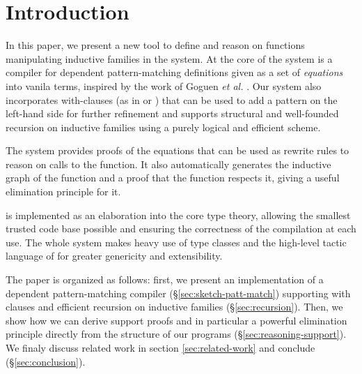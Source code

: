 \section{Introduction}

In this paper, we present a new tool to define and reason on functions
manipulating inductive families in the \Coq system.
At the core of the system is a compiler for dependent pattern-matching
definitions given as a set of \textit{equations} into vanila \Coq
terms, inspired by the work of Goguen {\it et al.}
\cite{DBLP:conf/birthday/GoguenMM06} . Our system also incorporates 
with-clauses (as in \Epigram or \Agda) that can be used to add a pattern
on the left-hand side for further refinement and supports structural and
well-founded recursion on inductive families using a purely logical and
efficient scheme.

The system provides proofs of the equations that can be used as
rewrite rules to reason on calls to the function. It also
automatically generates the inductive graph of the function and a
proof that the function respects it, giving a useful elimination
principle for it.

\Equations is implemented as an elaboration into the core \Coq type
theory, allowing the smallest trusted code base possible and ensuring 
the correctness of the compilation at each use.
The whole system makes heavy use of type classes and the high-level
tactic language of \Coq for greater genericity and extensibility.

The paper is organized as follows: first, we present an implementation of a
dependent pattern-matching compiler (\S \ref{sec:sketch-patt-match})
supporting with clauses and efficient recursion on inductive families
(\S \ref{sec:recursion}). Then, we show how we can derive support proofs
and in particular a powerful elimination principle directly from the
structure of our programs (\S \ref{sec:reasoning-support}). We finaly
discuss related work in section \ref{sec:related-work} and conclude (\S \ref{sec:conclusion}).

